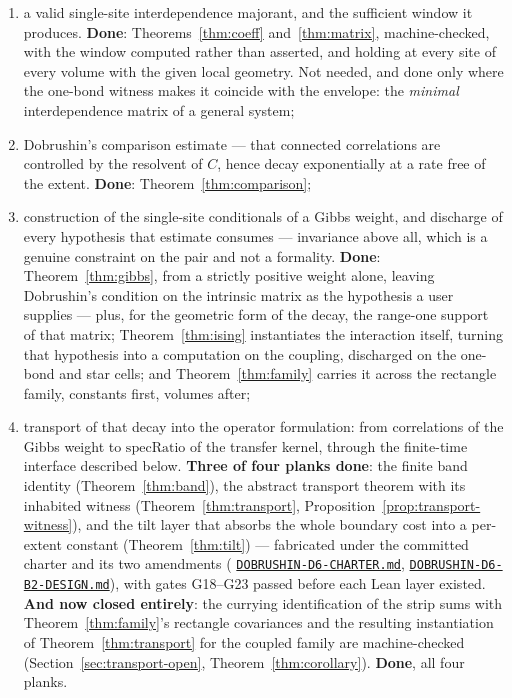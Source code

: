\documentclass[11pt]{article}
\theoremstyle{definition}
\newcommand{\anchor}{c7b870b05bd6d1bec270d499e1358a64070ce0e1}
\newcommand{\repofile}[2]{%
  \href{https://github.com/lluiseriksson/THE-ERIKSSON-PROGRAMME/blob/\anchor/#1}{\nolinkurl{#2}}}
\newcommand{\specRatio}{\mathrm{specRatio}}
\begin{document}
\begin{enumerate}
\item[\textbf{1.}] a valid single-site interdependence majorant, and the
      sufficient window it produces.  \textbf{Done}: Theorems~\ref{thm:coeff}
      and~\ref{thm:matrix}, machine-checked, with the window computed rather
      than asserted, and holding at every site of every volume with the given
      local geometry.  Not needed, and done only where the one-bond witness
      makes it coincide with the envelope: the \emph{minimal}
      interdependence matrix of a general system;
\item[\textbf{2.}] Dobrushin's comparison estimate \cite{Dobrushin1970,Simon1993}
      --- that connected correlations are controlled by the resolvent of $C$,
      hence decay exponentially at a rate free of the extent.  \textbf{Done}:
      Theorem~\ref{thm:comparison};
\item[\textbf{3.}] construction of the single-site conditionals of a Gibbs
      weight, and discharge of every hypothesis that estimate consumes ---
      invariance above all, which is a genuine constraint on the pair and not a
      formality.  \textbf{Done}: Theorem~\ref{thm:gibbs}, from a strictly
      positive weight alone, leaving Dobrushin's condition on the intrinsic
      matrix as the hypothesis a user supplies --- plus, for the geometric
      form of the decay, the range-one support of that matrix;
      Theorem~\ref{thm:ising} instantiates the interaction itself, turning
      that hypothesis into a computation on the coupling, discharged on the
      one-bond and star cells; and Theorem~\ref{thm:family} carries it
      across the rectangle family, constants first, volumes after;
\item[\textbf{4.}] transport of that decay into the operator formulation: from
      correlations of the Gibbs weight to $\specRatio$ of the transfer kernel,
      through the finite-time interface described below.
      \textbf{Three of four planks done}: the finite band identity
      (Theorem~\ref{thm:band}), the abstract transport theorem with its
      inhabited witness (Theorem~\ref{thm:transport},
      Proposition~\ref{prop:transport-witness}), and the tilt layer that
      absorbs the whole boundary cost into a per-extent constant
      (Theorem~\ref{thm:tilt}) --- fabricated under the committed charter
      and its two amendments
      (\repofile{docs/DOBRUSHIN-D6-CHARTER.md}{DOBRUSHIN-D6-CHARTER.md},
      \repofile{docs/DOBRUSHIN-D6-B2-DESIGN.md}{DOBRUSHIN-D6-B2-DESIGN.md}),
      with gates G18--G23 passed before each Lean layer existed.
      \textbf{And now closed entirely}: the currying identification of
      the strip sums with Theorem~\ref{thm:family}'s rectangle
      covariances and the resulting instantiation of
      Theorem~\ref{thm:transport} for the coupled family are
      machine-checked (Section~\ref{sec:transport-open},
      Theorem~\ref{thm:corollary}).  \textbf{Done}, all four planks.
\end{enumerate}
\end{document}
